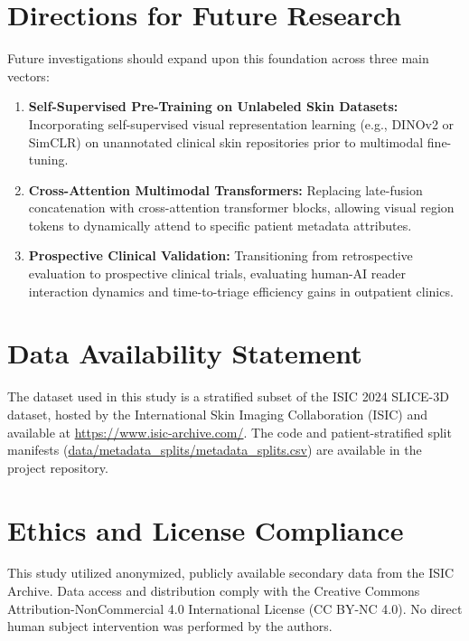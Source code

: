 \documentclass[12pt,a4paper]{report}
\begin{document}
	\section{Directions for Future Research}
	Future investigations should expand upon this foundation across three main vectors:
	\begin{enumerate}
		\item \textbf{Self-Supervised Pre-Training on Unlabeled Skin Datasets:} Incorporating self-supervised visual representation learning (e.g., DINOv2 or SimCLR) on unannotated clinical skin repositories prior to multimodal fine-tuning.
		\item \textbf{Cross-Attention Multimodal Transformers:} Replacing late-fusion concatenation with cross-attention transformer blocks, allowing visual region tokens to dynamically attend to specific patient metadata attributes.
		\item \textbf{Prospective Clinical Validation:} Transitioning from retrospective evaluation to prospective clinical trials, evaluating human-AI reader interaction dynamics and time-to-triage efficiency gains in outpatient clinics.
	\end{enumerate}
	
\section*{Data Availability Statement}

The dataset used in this study is a stratified subset of the ISIC 2024 SLICE-3D dataset, hosted by the International Skin Imaging Collaboration (ISIC) and available at \url{https://www.isic-archive.com/}. The code and patient-stratified split manifests (\url{data/metadata_splits/metadata_splits.csv}) are available in the project repository.
	
	\section*{Ethics and License Compliance}
	
	This study utilized anonymized, publicly available secondary data from the ISIC Archive. Data access and distribution comply with the Creative Commons Attribution-NonCommercial 4.0 International License (CC BY-NC 4.0). No direct human subject intervention was performed by the authors.
	
\end{document}
